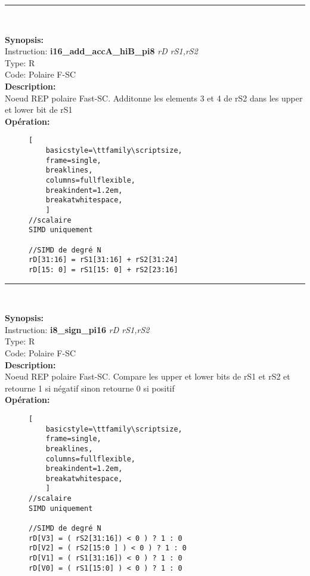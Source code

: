 \rule{8cm}{0.4pt}\\
{\scriptsize
\textbf{Synopsis:}\\
Instruction: \textbf{i16\_add\_accA\_hiB\_pi8 } \textit{rD rS1,rS2}\\
Type: R\\
Code: Polaire F-SC\\
\textbf{Description:}\\
Noeud REP polaire Fast-SC. Additonne les elements 3 et 4 de rS2 dans les upper et lower bit de rS1\\
\textbf{Opération:}\\
    \begin{figure}[H]
    \begin{lstlisting}[
    basicstyle=\ttfamily\scriptsize,
    frame=single,
    breaklines,
    columns=fullflexible,
    breakindent=1.2em,
    breakatwhitespace,
    ]
//scalaire
SIMD uniquement 
    
//SIMD de degré N
rD[31:16] = rS1[31:16] + rS2[31:24] 
rD[15: 0] = rS1[15: 0] + rS2[23:16] 
\end{lstlisting}
\end{figure}
}
\rule{8cm}{0.4pt}\\
{\scriptsize
\textbf{Synopsis:}\\
Instruction: \textbf{i8\_sign\_pi16 } \textit{rD rS1,rS2}\\
Type: R\\
Code: Polaire F-SC\\
\textbf{Description:}\\
Noeud REP polaire Fast-SC. Compare les upper et lower bits de rS1 et rS2 et retourne 1 si négatif sinon retourne 0 si positif\\
\textbf{Opération:}\\
    \begin{figure}[H]
    \begin{lstlisting}[
    basicstyle=\ttfamily\scriptsize,
    frame=single,
    breaklines,
    columns=fullflexible,
    breakindent=1.2em,
    breakatwhitespace,
    ]
//scalaire
SIMD uniquement 
    
//SIMD de degré N
rD[V3] = ( rS2[31:16]) < 0 ) ? 1 : 0
rD[V2] = ( rS2[15:0 ] ) < 0 ) ? 1 : 0 
rD[V1] = ( rS1[31:16]) < 0 ) ? 1 : 0 
rD[V0] = ( rS1[15:0] ) < 0 ) ? 1 : 0 
\end{lstlisting}
\end{figure}
}
